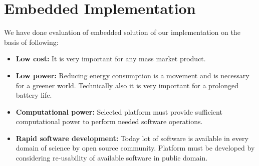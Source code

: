 
\chapter{Embedded Implementation} %
\label{Chapter3}
We have done evaluation of embedded solution of our implementation on
the basis of following:
\begin{itemize}
	\item \textbf{Low cost:} It is very important for any mass
		market product.
	\item \textbf{Low power:} Reducing energy consumption is a
		movement and is necessary for a greener world.
		Technically also it is very important for a prolonged
		battery life.
	\item \textbf{Computational power:} Selected platform must
		provide sufficient computational power to perform
		needed software operations.
	\item \textbf{Rapid software development:} Today lot of software
		is available in every domain of science by open source
		community. Platform must be developed by considering
		re-usability of available software in public domain.
\end{itemize}
